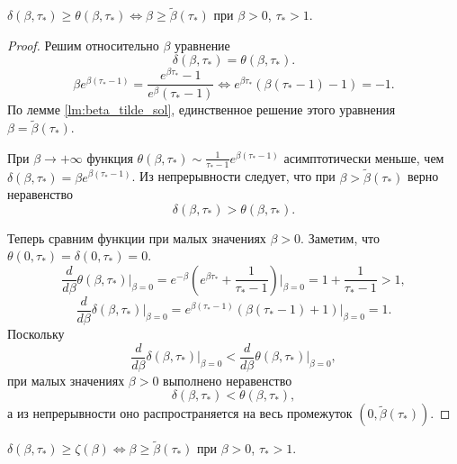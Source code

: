\begin{proposition}
	\label{prop:delta_theta}
	$\delta(\beta, \tau_*) \geq \theta(\beta, \tau_*) \Leftrightarrow \beta \geq \tilde{\beta}(\tau_*)$ при $\beta > 0$, $\tau_* > 1$.  
\end{proposition}

\begin{proof}
	Решим относительно $\beta$ уравнение 
	\[
	\delta(\beta, \tau_*) = \theta(\beta, \tau_*).
	\]
	\[
	\beta e^{\beta(\tau_*- 1)} = \dfrac{e^{\beta \tau_*} - 1}{e^{\beta} (\tau_* - 1)} \Leftrightarrow e^{\beta\tau_*}(\beta(\tau_* - 1) - 1) = -1.
	\]
	По лемме \ref{lm:beta_tilde_sol}, единственное решение этого уравнения $\beta = \tilde{\beta}(\tau_*)$.
	
	При $\beta \to +\infty$ функция $\theta(\beta, \tau_*) \sim \frac{1}{\tau_* - 1}e^{\beta(\tau_* - 1)}$ асимптотически меньше, чем $\delta(\beta, \tau_*) = \beta e^{\beta (\tau_* - 1)}$. Из непрерывности следует, что при $\beta > \tilde{\beta}(\tau_*)$ верно неравенство
	\[
	\delta(\beta, \tau_*) > \theta(\beta, \tau_*).
	\]
	
	Теперь сравним функции при малых значениях $\beta > 0$. Заметим, что $\theta(0, \tau_*) = \delta(0, \tau_*) = 0$.
	\[
	\frac{d}{d\beta}\theta(\beta, \tau_*)\Bigg\vert_{\beta = 0} = e^{-\beta}\left( e^{\beta \tau_*} + \frac{1}{\tau_* - 1}\right)\Bigg\vert_{\beta = 0} = 1 + \frac{1}{\tau_* - 1} > 1,
	\]
	\[
	\frac{d}{d\beta}\delta(\beta, \tau_*)\Bigg\vert_{\beta = 0} = e^{\beta(\tau_* - 1)}(\beta(\tau_* - 1) + 1)\Bigg\vert_{\beta = 0} = 1.
	\]
	Поскольку
	\[
	\frac{d}{d\beta}\delta(\beta, \tau_*)\bigg\vert_{\beta = 0} < \frac{d}{d\beta}\theta(\beta, \tau_*)\bigg\vert_{\beta = 0},
	\]
	при малых значениях $\beta > 0$ выполнено неравенство
	\[
	\delta(\beta, \tau_*) < \theta(\beta, \tau_*),
	\]
	а из непрерывности оно распространяется на весь промежуток $\left(0, \tilde{\beta}(\tau_*)\right)$.    
\end{proof}


\begin{proposition}
	\label{prop:delta_zeta}
	$\delta(\beta, \tau_*) \geq \zeta(\beta) \Leftrightarrow \beta \geq \tilde{\beta}(\tau_*)$ при $\beta > 0$, $\tau_* > 1$.  
\end{proposition}

